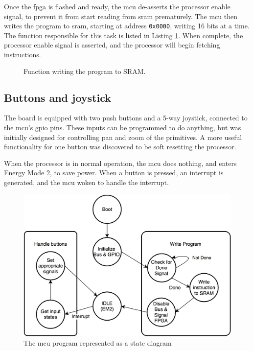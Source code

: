 Once the \gls{fpga} is flashed and ready, the \gls{mcu} de-asserts the processor enable signal, to prevent it from start reading from \gls{sram} prematurely.
The \gls{mcu} then writes the program to \gls{sram}, starting at address \texttt{0x0000}, writing 16 bits at a time. The function responsible for this task is listed in Listing \ref{fig:write_program}.
When complete, the processor enable signal is asserted, and the processor will begin fetching instructions.

\begin{figure}
	\centering
	
	\caption{Function writing the program to SRAM.}
	\label{fig:write_program}
\end{figure}

\subsection{Buttons and joystick}
The board is equipped with two push buttons and a 5-way joystick, connected to the \gls{mcu}'s \gls{gpio} pins.
These inputs can be programmed to do anything, but was initially designed for controlling pan and zoom of the primitives.
A more useful functionality for one button was discovered to be soft resetting the processor.

When the processor is in normal operation, the \gls{mcu} does nothing, and enters Energy Mode 2, to save power.
When a button is pressed, an interrupt is generated, and the \gls{mcu} woken to handle the interrupt.

\begin{figure}[h!]
\centering \includegraphics[width = 0.75\linewidth]{images/MCU_state.png}
\caption{The \gls{mcu} program represented as a state diagram}
\label{fig:mcu_state}
\end{figure}
